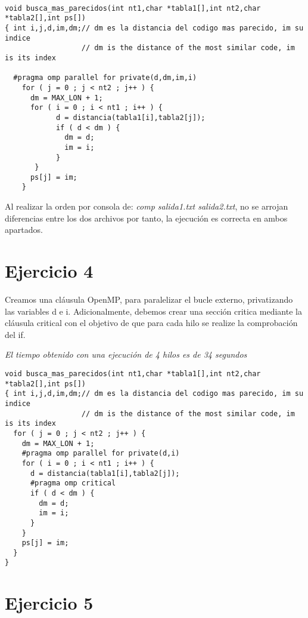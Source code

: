 \documentclass[11pt]{article}
\begin{document}
\begin{lstlisting}

void busca_mas_parecidos(int nt1,char *tabla1[],int nt2,char *tabla2[],int ps[])
{ int i,j,d,im,dm;// dm es la distancia del codigo mas parecido, im su indice
                  // dm is the distance of the most similar code, im is its index
  
  #pragma omp parallel for private(d,dm,im,i)
    for ( j = 0 ; j < nt2 ; j++ ) {
      dm = MAX_LON + 1;
      for ( i = 0 ; i < nt1 ; i++ ) {
			d = distancia(tabla1[i],tabla2[j]);
			if ( d < dm ) {
			  dm = d;
			  im = i;
			}
       }
      ps[j] = im;
    }

\end{lstlisting}

Al realizar la orden por consola de: \emph{comp salida1.txt salida2.txt}, no se arrojan diferencias entre los dos archivos por tanto, la ejecución es correcta en ambos apartados.

\section*{Ejercicio 4}

Creamos una cláusula OpenMP, para paralelizar el bucle externo, privatizando las variables d e i. Adicionalmente, debemos crear una sección critica mediante la cláusula critical con el objetivo de que para cada hilo se realize la comprobación del if.

\emph{El tiempo obtenido con una ejecución de 4 hilos es de 34 segundos}

\begin{lstlisting}
void busca_mas_parecidos(int nt1,char *tabla1[],int nt2,char *tabla2[],int ps[])
{ int i,j,d,im,dm;// dm es la distancia del codigo mas parecido, im su indice
                  // dm is the distance of the most similar code, im is its index
  for ( j = 0 ; j < nt2 ; j++ ) {
    dm = MAX_LON + 1;
    #pragma omp parallel for private(d,i)
    for ( i = 0 ; i < nt1 ; i++ ) {
      d = distancia(tabla1[i],tabla2[j]);
      #pragma omp critical
      if ( d < dm ) {
        dm = d;
        im = i;
      }
    }
    ps[j] = im;
  }
}
\end{lstlisting}

\pagebreak

\section*{Ejercicio 5}
\end{document}
